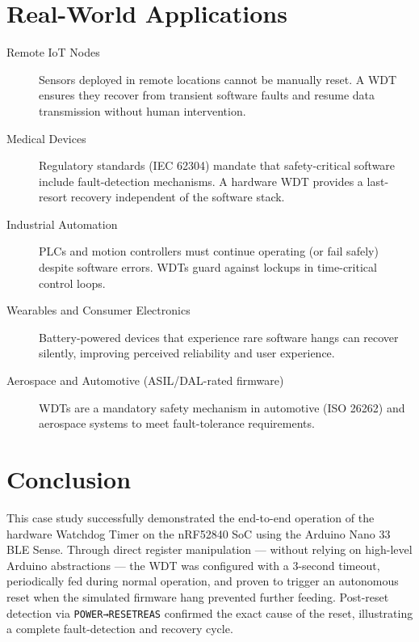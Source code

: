 \documentclass[12pt, a4paper]{article}
\begin{document}
\section{Real-World Applications}

\begin{description}
  \item[Remote IoT Nodes] Sensors deployed in remote locations cannot be
    manually reset. A WDT ensures they recover from transient software faults
    and resume data transmission without human intervention.

  \item[Medical Devices] Regulatory standards (IEC 62304) mandate that
    safety-critical software include fault-detection mechanisms. A hardware WDT
    provides a last-resort recovery independent of the software stack.

  \item[Industrial Automation] PLCs and motion controllers must continue
    operating (or fail safely) despite software errors. WDTs guard against
    lockups in time-critical control loops.

  \item[Wearables and Consumer Electronics] Battery-powered devices that
    experience rare software hangs can recover silently, improving perceived
    reliability and user experience.

  \item[Aerospace and Automotive (ASIL/DAL-rated firmware)] WDTs are a
    mandatory safety mechanism in automotive (ISO 26262) and aerospace systems
    to meet fault-tolerance requirements.
\end{description}

\section{Conclusion}

This case study successfully demonstrated the end-to-end operation of the
hardware Watchdog Timer on the nRF52840 SoC using the Arduino Nano 33 BLE
Sense. Through direct register manipulation — without relying on high-level
Arduino abstractions — the WDT was configured with a 3-second timeout,
periodically fed during normal operation, and proven to trigger an autonomous
reset when the simulated firmware hang prevented further feeding. Post-reset
detection via \texttt{POWER→RESETREAS} confirmed the exact cause of the reset,
illustrating a complete fault-detection and recovery cycle.
\end{document}

